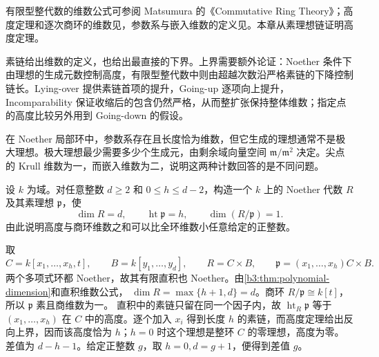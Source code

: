 \ProseParagraphBreak
有限型整代数的维数公式可参阅 Matsumura 的《Commutative Ring Theory》\cite[Theorem 5.6, pp. 34--35]{Matsumura1989CommutativeRingTheory}；高度定理和逐次商环的维数见\cite[Theorems 13.5--13.6, pp. 100--101]{Matsumura1989CommutativeRingTheory}，参数系与嵌入维数的定义见\cite[\S14, Systems of parameters and multiplicity, pp. 104--105]{Matsumura1989CommutativeRingTheory}。本章从素理想链证明高度定理。






\begin{chaptersummary}
	素链给出维数的定义，也给出最直接的下界。上界需要额外论证：Noether 条件下由理想的生成元数控制高度，有限型整代数中则由超越次数沿严格素链的下降控制链长。Lying-over 提供素链首项的提升，Going-up 逐项向上提升，Incomparability 保证收缩后的包含仍然严格，从而整扩张保持整体维数；指定点的高度比较另外用到 Going-down 的假设。

	\ProseParagraphBreak
	在 Noether 局部环中，参数系存在且长度恰为维数，但它生成的理想通常不是极大理想。极大理想最少需要多少个生成元，由剩余域向量空间 \(\mathfrak m/\mathfrak m^2\) 决定。尖点的 Krull 维数为一，而嵌入维数为二，说明这两种计数回答的是不同问题。
\end{chaptersummary}

\BookExercises

\begin{exercise}\label{b3:ex:09-product-dimension}
	设 \(k\) 为域。对任意整数 \(d\ge2\) 和 \(0\le h\le d-2\)，构造一个 \(k\) 上的 Noether 代数 \(R\) 及其素理想 \(\mathfrak p\)，使
	\[
		\dim R=d,\qquad \operatorname{ht}\mathfrak p=h,\qquad \dim(R/\mathfrak p)=1.
	\]
	由此说明高度与商环维数之和可以比全环维数小任意给定的正整数。
\end{exercise}
\begin{solution}
	取
	\[
		C=k[x_1,\ldots,x_h,t],\qquad B=k[y_1,\ldots,y_d],\qquad R=C\times B,\qquad \mathfrak p=(x_1,\ldots,x_h)C\times B.
	\]
	两个多项式环都 Noether，故其有限直积也 Noether。由\cref{b3:thm:polynomial-dimension}和直积维数公式， \(\dim R=\max\{h+1,d\}=d\)。商环 \(R/\mathfrak p\cong k[t]\)，所以 \(\mathfrak p\) 素且商维数为一。 直积中的素链只留在同一个因子内，故 \(\operatorname{ht}_R\mathfrak p\) 等于 \((x_1,\ldots,x_h)\) 在 \(C\) 中的高度。逐个加入 \(x_i\) 得到长度 \(h\) 的素链，而高度定理给出反向上界，因而该高度恰为 \(h\)；\(h=0\) 时这个理想是整环 \(C\) 的零理想，高度为零。 差值为 \(d-h-1\)。给定正整数 \(g\)，取 \(h=0,d=g+1\)，便得到差值 \(g\)。
\end{solution}

